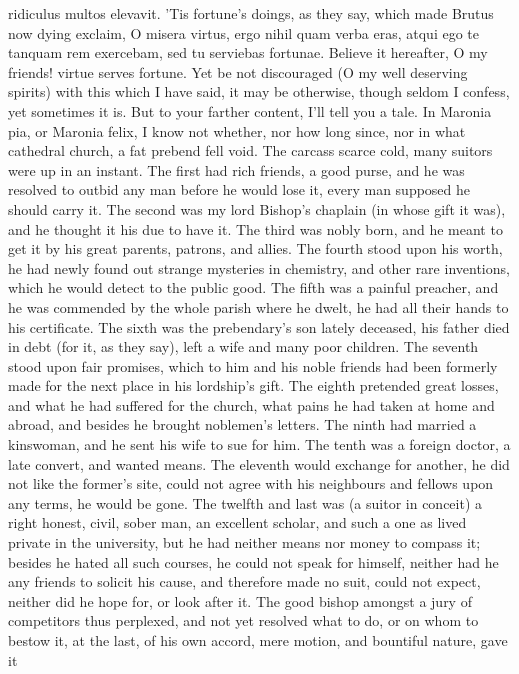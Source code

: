 {ridiculus multos elevavit. 'Tis fortune's doings, as they say, which
made Brutus now dying exclaim, O misera virtus, ergo nihil quam verba
eras, atqui ego te tanquam rem exercebam, sed tu serviebas fortunae.
Believe it hereafter, O my friends! virtue serves fortune. Yet be
not discouraged (O my well deserving spirits) with this which I have
said, it may be otherwise, though seldom I confess, yet sometimes it
is. But to your farther content, I'll tell you a tale. In Maronia
pia, or Maronia felix, I know not whether, nor how long since, nor in
what cathedral church, a fat prebend fell void. The carcass scarce
cold, many suitors were up in an instant. The first had rich friends, a
good purse, and he was resolved to outbid any man before he would lose
it, every man supposed he should carry it. The second was my lord
Bishop's chaplain (in whose gift it was), and he thought it his due to
have it. The third was nobly born, and he meant to get it by his great
parents, patrons, and allies. The fourth stood upon his worth, he had
newly found out strange mysteries in chemistry, and other rare
inventions, which he would detect to the public good. The fifth was a
painful preacher, and he was commended by the whole parish where he
dwelt, he had all their hands to his certificate. The sixth was the
prebendary's son lately deceased, his father died in debt (for it, as
they say), left a wife and many poor children. The seventh stood upon
fair promises, which to him and his noble friends had been formerly
made for the next place in his lordship's gift. The eighth pretended
great losses, and what he had suffered for the church, what pains he
had taken at home and abroad, and besides he brought noblemen's
letters. The ninth had married a kinswoman, and he sent his wife to sue
for him. The tenth was a foreign doctor, a late convert, and wanted
means. The eleventh would exchange for another, he did not like the
former's site, could not agree with his neighbours and fellows upon any
terms, he would be gone. The twelfth and last was (a suitor in conceit)
a right honest, civil, sober man, an excellent scholar, and such a one
as lived private in the university, but he had neither means nor money
to compass it; besides he hated all such courses, he could not speak
for himself, neither had he any friends to solicit his cause, and
therefore made no suit, could not expect, neither did he hope for, or
look after it. The good bishop amongst a jury of competitors thus
perplexed, and not yet resolved what to do, or on whom to bestow it, at
the last, of his own accord, mere motion, and bountiful nature, gave it
}
